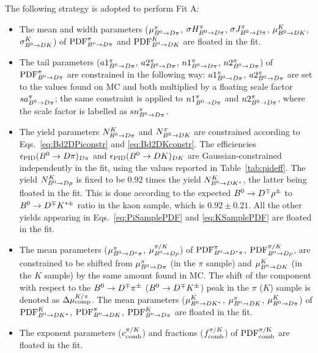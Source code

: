 The following strategy is adopted to perform Fit A:
\begin{itemize}[noitemsep,topsep=0pt]
	\item The mean and width parameters ($\mu^{\pi}_{B^0\rightarrow D\pi}$,
		$\sigma H^{\pi}_{B^0\rightarrow D\pi}$, $\sigma J^{\pi}_{B^0\rightarrow D\pi}$, $\mu^{K}_{B^0\rightarrow DK}$, $\sigma^{K}_{B^0\rightarrow DK}$)
		of ${\rm{PDF}}^{\pi}_{B^0\rightarrow D\pi}$ and ${\rm PDF}^{K}_{B^0\rightarrow DK}$ are floated in the fit.
	\item The tail parameters ($a1^{\pi}_{B^0\rightarrow D\pi}$, $a2^{\pi}_{B^0\rightarrow D\pi}$,
		$n1^{\pi}_{B^0\rightarrow D\pi}$, $n2^{\pi}_{B^0\rightarrow D\pi}$) of
		${\rm{PDF}}^{\pi}_{B^0\rightarrow D\pi}$ are constrained in the following way:
		$a1^{\pi}_{B^0\rightarrow D\pi}$, $a2^{\pi}_{B^0\rightarrow D\pi}$ are set to the values
		found on MC and both multiplied by a floating scale factor
		$sa^{\pi}_{B^0\rightarrow D\pi}$; the same constraint is applied to
		$n1^{\pi}_{B^0\rightarrow D\pi}$ and $n2^{\pi}_{B^0\rightarrow D\pi}$, where the scale
		factor is labelled as $sn^{\pi}_{B^0\rightarrow D\pi}$.
	\item The yield parameters $N^{K}_{B^0\rightarrow D\pi}$ and $N^{\pi}_{B^0\rightarrow DK}$ are
		constrained according to Eqs.~\ref{eq:Bd2DPiconstr} and \ref{eq:Bd2DKconstr}. The
		efficiencies $\epsilon_{\rm PID}(B^0\rightarrow D\pi)_{D\pi}$ and $\epsilon_{\rm
		PID}(B^0\rightarrow DK)_{DK}$ are Gaussian-constrained independently in the fit,
		using the values reported in Table~\ref{tab:pideff}. 
		The yield $N^{K}_{B^0\rightarrow D\rho}$ is fixed to be $0.92$ times
		the yield $N^{K}_{B^0\rightarrow DK^*}$, the latter being floated in the fit.
		This is done according to the expected $B^0\rightarrow D^\mp\rho^\pm$ to $B^0\rightarrow D^\mp K^{*\pm}$
		ratio in the kaon sample, which is $0.92\pm0.21$. All the other yields
		appearing in Eqs.~\ref{eq:PiSamplePDF} and
		\ref{eq:KSamplePDF} are floated in the fit.
	\item The mean parameters ($\mu^{\pi}_{B^0\rightarrow D^*\pi}$, $\mu^{\pi/K}_{B^0\rightarrow
		D\rho}$) of ${\rm{PDF}}^{\pi}_{B^0\rightarrow D^*\pi}$, ${\rm{PDF}}^{\pi/K}_{B^0\rightarrow
		D\rho}$, are constrained to be shifted from $\mu^{\pi}_{B^0\rightarrow D\pi}$
		(in the $\pi$ sample) and $\mu^{K}_{B^0\rightarrow DK}$ (in the $K$ sample) by
		the same amount found in MC. The shift of the component with
		respect to the $B^0\rightarrow D^\mp\pi^\pm$ ($B^0\rightarrow D^\mp K^{\pm}$) peak in the $\pi$ ($K$) sample 
                is denoted as $\Delta\mu^{K/\pi}_{\rm comp}$. The
		mean parameters ($\mu^{K}_{B^0\rightarrow DK^*}$, $\mu^{\pi}_{B^0\rightarrow DK}$,
		$\mu^{K}_{B^0\rightarrow D\pi}$) of ${\rm{PDF}}^{K}_{B^0\rightarrow DK^*}$,
		${\rm{PDF}}^{\pi}_{B^0\rightarrow DK}$, ${\rm{PDF}}^{K}_{B^0\rightarrow D\pi}$ are floated in the
		fit.
	\item The exponent parameters ($c^{\pi/K}_{\rm comb}$) and fractions
		($f^{\pi/K}_{\rm comb}$) of $\rm{PDF}^{\pi/K}_{\rm comb}$ are floated in the
		fit.
\end{itemize}

